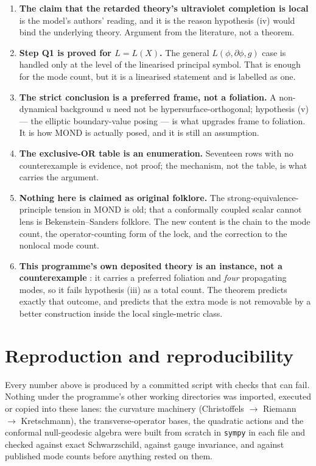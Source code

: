 \documentclass[11pt,letterpaper]{article}
\begin{document}
\begin{enumerate}
\item \textbf{The claim that the retarded theory's ultraviolet completion is local} is the model's authors' reading, and it is the reason hypothesis (iv) would bind the underlying theory. Argument from the literature, not a theorem.
\item \textbf{Step Q1 is proved for $L=L(X)$.} The general $L(\phi,\partial\phi,g)$ case is handled only at the level of the linearised principal symbol. That is enough for the mode count, but it is a linearised statement and is labelled as one.
\item \textbf{The strict conclusion is a preferred frame, not a foliation.} A non-dynamical background $u$ need not be hypersurface-orthogonal; hypothesis (v) --- the elliptic boundary-value posing --- is what upgrades frame to foliation. It is how MOND is actually posed, and it is still an assumption.
\item \textbf{The exclusive-OR table is an enumeration.} Seventeen rows with no counterexample is evidence, not proof; the mechanism, not the table, is what carries the argument.
\item \textbf{Nothing here is claimed as original folklore.} The strong-equivalence-principle tension in MOND is old; that a conformally coupled scalar cannot lens is Bekenstein--Sanders folklore. The new content is the chain to the mode count, the operator-counting form of the lock, and the correction to the nonlocal mode count.
\item \textbf{This programme's own deposited theory is an instance, not a counterexample} \cite{Zimmerman2026paper8}: it carries a preferred foliation and \emph{four} propagating modes, so it fails hypothesis (iii) as a total count. The theorem predicts exactly that outcome, and predicts that the extra mode is not removable by a better construction inside the local single-metric class.
\end{enumerate}

\section{Reproduction and reproducibility}

Every number above is produced by a committed script with checks that can fail. Nothing under the programme's other working directories was imported, executed or copied into these lanes: the curvature machinery (Christoffels $\to$ Riemann $\to$ Kretschmann), the transverse-operator bases, the quadratic actions and the conformal null-geodesic algebra were built from scratch in \texttt{sympy} in each file and checked against exact Schwarzschild, against gauge invariance, and against published mode counts before anything rested on them.
\end{document}
